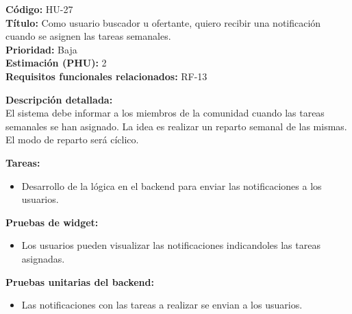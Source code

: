 \begin{tarjetaHU}
\textbf{Código:} HU-27 \\
\textbf{Título:} Como usuario buscador u ofertante, quiero recibir una notificación cuando se asignen las tareas semanales. \\
\textbf{Prioridad:} Baja \\
\textbf{Estimación (PHU):} 2 \\
\textbf{Requisitos funcionales relacionados:} RF-13

\vspace{0.5em}
\textbf{Descripción detallada:} \\
El sistema debe informar a los miembros de la comunidad cuando las tareas semanales se han asignado. La idea es realizar un reparto semanal de las mismas. El modo de reparto será cíclico.

\vspace{0.5em}
\textbf{Tareas:}
\begin{itemize}[left=0pt]
  \item Desarrollo de la lógica en el backend para enviar las notificaciones a los usuarios.
\end{itemize}

\vspace{0.5em}
\textbf{Pruebas de widget:}
\begin{itemize}[left=0pt]
  \item Los usuarios pueden visualizar las notificaciones indicandoles las tareas asignadas.
\end{itemize}
\textbf{Pruebas unitarias del backend:}
\begin{itemize}[left=0pt]
  \item Las notificaciones con las tareas a realizar se envian a los usuarios.
\end{itemize}
\end{tarjetaHU}

